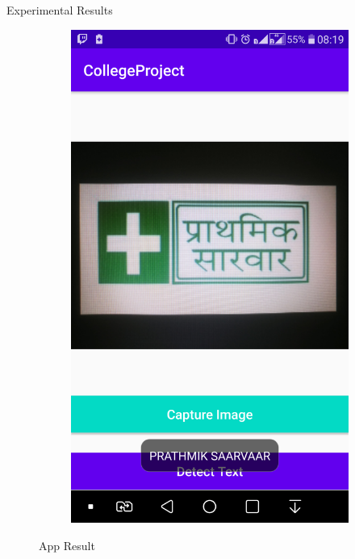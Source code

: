 \documentclass{beamer}
\begin{document}
\begin{frame}[allowframebreaks]{Experimental Results}
\begin{figure}
\begin{subfigure}[b]{0.3\linewidth}
			{\includegraphics[width=\linewidth]{App_FResult_2}}
			\label{App}
           \end{subfigure}
	\caption{App Result}
	\end{figure}

\end{frame}
\end{document}
